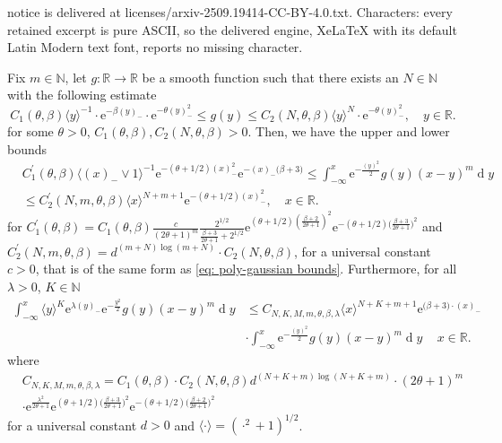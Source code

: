\documentclass[10pt,a4paper]{amsart}
\newcommand{\N}{\ensuremath{\mathbb{N}}}
\newcommand{\R}{\ensuremath{\mathbb{R}}}
\newcommand{\diff}{\ensuremath{\operatorname{d}\!}}
\begin{document}
notice is delivered at licenses/arxiv-2509.19414-CC-BY-4.0.txt. Characters: every retained excerpt is pure ASCII, so the delivered engine, XeLaTeX with its default Latin Modern text font, reports no missing character.
\begin{lemma}\label{lemma: integral estimate}
Fix $m\in \N$, let $g:\R\to \R $ be a smooth function such that there exists an $N\in \N$ with the following estimate
\begin{equation*}\label{eq: poly-gaussian bounds}
    C_1(\theta, \beta)\langle y\rangle^{-1}\cdot \mathrm{e}^{-\beta(y)_-}\cdot \mathrm{e}^{-\theta(y)^2_-} \le g(y) \le C_2(N, \theta, \beta) \langle y\rangle^{N}\cdot \mathrm{e}^{-\theta(y)^2_-},\quad y\in \R.
\end{equation*}
for some $\theta >0$, $C_1(\theta, \beta), C_2(N, \theta, \beta)>0$. Then, we have the upper and lower bounds
    \begin{align*}
          &C^\prime_1(\theta, \beta)\langle (x)_-\lor 1 \rangle ^{-1} \mathrm{e}^{-(\theta + 1/2)(x)_-^2}\mathrm{e}^{-(x)_-\big(\beta+3\big)}\le \displaystyle\int^x_{-\infty}\mathrm{e}^{-\frac{(y)^2}{2}} g(y)(x-y)^m\diff y \\
         & \le C^\prime_2(N, m, \theta, \beta)\langle x\rangle ^{N+m+1}\mathrm{e}^{-(\theta+1/2)(x)_-^2},\quad x\in \R.
    \end{align*}
for $C^\prime_1(\theta, \beta) = C_1(\theta, \beta)\frac{c}{(2\theta+1)^m}\frac{2^{1/2}}{\frac{\beta+3}{2\theta +1} +  2^{1/2}}\mathrm{e}^{(\theta + 1/2)(\frac{\beta+2}{2\theta +1})^2}\mathrm{e}^{-(\theta + 1/2)\big(\frac{\beta+3}{2\theta +1}\big)^2}$ and\\ $C^\prime_2(N, m, \theta, \beta) =  d^{(m+N)\log (m+N)}\cdot C_2(N, \theta, \beta)$, for a universal constant $c>0$, that is of the same form as \ref{eq: poly-gaussian bounds}. Furthermore, for all $\lambda>0$, $K\in \N$
\begin{align*}
    \displaystyle\int^x_{-\infty} \langle y \rangle^K \mathrm{e}^{\lambda(y)_-}\mathrm{e}^{-\frac{y^2}{2}} g(y)(x-y)^m\diff y &\le C_{N,K, M, m, \theta, \beta, \lambda}  \langle x\rangle ^{N+K+m+1}\mathrm{e}^{\big(\beta +3\big)\cdot (x)_-}\\
    & \cdot\displaystyle\int^x_{-\infty}\mathrm{e}^{-\frac{(y)^2}{2}} g(y)(x-y)^m\diff y\, \quad x\in \R.
\end{align*}
where 
\begin{align*}
         & C_{N,K,M,m,\theta, \beta, \lambda}=C_1(\theta, \beta) \cdot C_2(N, \theta, \beta) d^{(N+K+m)\log(N+K+m)}\cdot(2\theta+1)^m  \\
         & \cdot \mathrm{e}^{\frac{\lambda^2}{2\theta + 1}} \mathrm{e}^{(\theta + 1/2)\big(\frac{\beta+3}{2\theta +1}\big)^2} \mathrm{e}^{-(\theta + 1/2)\big(\frac{\beta+2}{2\theta +1}\big)^2}
    \end{align*}
for a universal constant $d>0$ and $\langle\cdot \rangle = (\cdot ^2 + 1)^{1/2}$. 
\end{lemma}
\end{document}
